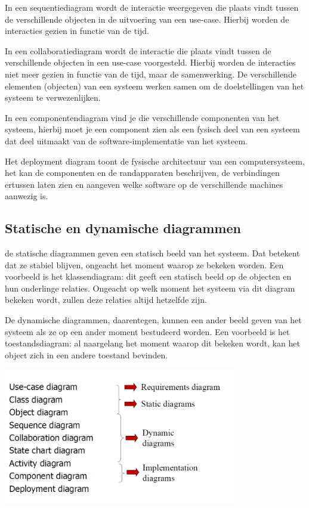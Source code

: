 
In een sequentiediagram wordt de interactie weergegeven die plaats vindt tussen de verschillende objecten in de uitvoering van een use-case. Hierbij worden de interacties gezien in functie van de tijd.


In een collaboratiediagram wordt de interactie die plaats vindt tussen de verschillende objecten in een use-case voorgesteld. Hierbij worden de interacties niet meer gezien in functie van de tijd, maar de samenwerking.
De verschillende elementen (objecten) van een systeem werken samen om de doelstellingen van het systeem te verwezenlijken.


In een componentendiagram vind je die verschillende componenten van het systeem, hierbij moet je een component zien als een fysisch deel van een systeem dat deel uitmaakt van de software-implementatie van het systeem.


Het deployment diagram toont de fysische architectuur van een computersysteem, het kan de componenten en de randapparaten beschrijven, de verbindingen ertussen laten zien en aangeven welke software op de verschillende machines aanwezig is.

\subsection{Statische en dynamische diagrammen}

de statische diagrammen geven een statisch beeld van het systeem. Dat betekent dat ze stabiel blijven, ongeacht het moment waarop ze bekeken worden. Een voorbeeld is het klassendiagram: dit geeft een statisch beeld op de objecten en hun onderlinge relaties. Ongeacht op welk moment het systeem via dit diagram bekeken wordt, zullen deze relaties altijd hetzelfde zijn.

De dynamische diagrammen, daarentegen, kunnen een ander beeld geven van het systeem als ze op een ander moment bestudeerd worden. Een voorbeeld is het toestandsdiagram: al naargelang het moment waarop dit bekeken wordt, kan het object zich in een andere toestand bevinden.

\begin{center}
\includegraphics[width=4in]{img/overviewumllen}%
\label{labelname}%
\end{center}

